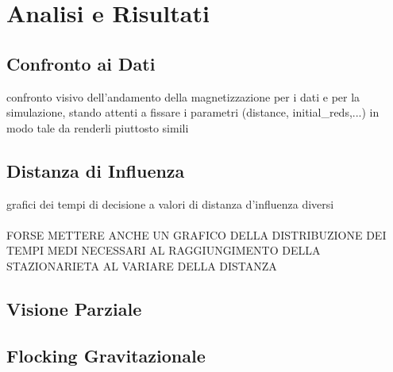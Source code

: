 \documentclass{article}
\begin{document}


\section{Analisi e Risultati}
\label{Sec:4}

\subsection{Confronto ai Dati}
\label{Sec:4.1}
confronto visivo dell'andamento della magnetizzazione per i dati e per la simulazione, stando attenti a fissare i parametri (distance, initial\_reds,...) in modo tale da renderli piuttosto simili

\subsection{Distanza di Influenza}
\label{Sec:4.2}
grafici dei tempi di decisione a valori di distanza d'influenza diversi
\\
\\ FORSE METTERE ANCHE UN GRAFICO DELLA DISTRIBUZIONE DEI TEMPI MEDI NECESSARI AL RAGGIUNGIMENTO DELLA STAZIONARIETA AL VARIARE DELLA DISTANZA

\subsection{Visione Parziale}
\label{Sec:4.3}

\subsection{Flocking Gravitazionale}
\label{Sec:4.4}
\end{document}

